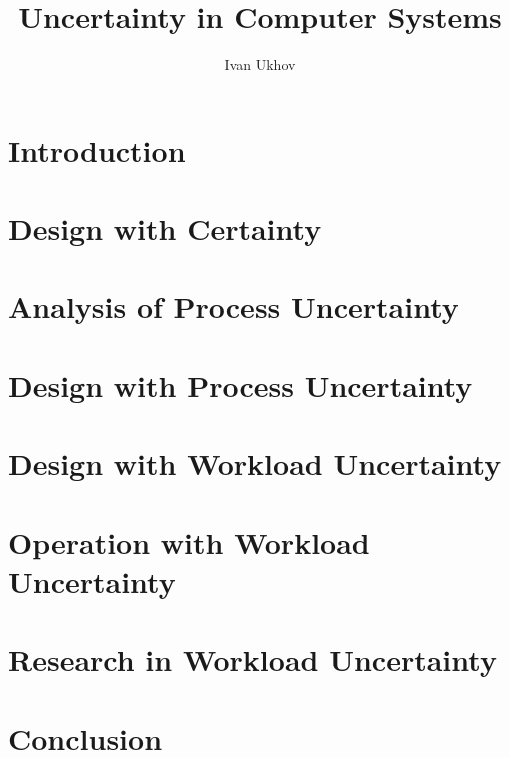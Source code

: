 \documentclass{thesis}
\title{Uncertainty in Computer Systems}
\author{Ivan Ukhov}
\begin{document}
\nocite{ukhov2012, ukhov2014a, ukhov2014b, ukhov2015, ukhov2017}

\chapter{Introduction}
\newcommand{\inputsection}{}


\chapter{Design with Certainty}
\renewcommand{\inputsection}[1]{}


\chapter{Analysis of Process Uncertainty}
\renewcommand{\inputsection}[1]{}


\chapter{Design with Process Uncertainty}
\renewcommand{\inputsection}[1]{}


\chapter{Design with Workload Uncertainty}
\renewcommand{\inputsection}[1]{}


\chapter{Operation with Workload Uncertainty}
\renewcommand{\inputsection}[1]{}


\chapter{Research in Workload Uncertainty}
\renewcommand{\inputsection}[1]{}


\chapter{Conclusion}


\printbibliography
\end{document}
